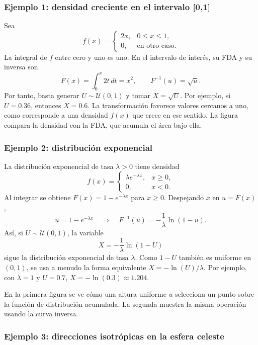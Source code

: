 \subsubsection{Ejemplo 1: densidad creciente en el intervalo [0,1]}

Sea
\[
    f(x)=\begin{cases}2x,&0\leq x\leq1,\\0,&\text{en otro caso.}\end{cases}
\]
La integral de $f$ entre cero y uno es uno. En el intervalo de interés, su FDA
y su inversa son
\[
    F(x)=\int_0^x 2t\,dt=x^2,
    \qquad F^{-1}(u)=\sqrt{u}.
\]
Por tanto, basta generar $U\sim\mathcal{U}(0,1)$ y tomar $X=\sqrt U$. Por
ejemplo, si $U=0.36$, entonces $X=0.6$. La transformación favorece valores
cercanos a uno, como corresponde a una densidad $f(x)$ que crece en ese
sentido. La figura compara la densidad con la FDA, que acumula el área bajo
ella.



\subsubsection{Ejemplo 2: distribución exponencial}

La distribución exponencial de tasa $\lambda>0$ tiene densidad
\[
    f(x)=\begin{cases}\lambda e^{-\lambda x},&x\geq0,\\0,&x<0.\end{cases}
\]
Al integrar se obtiene $F(x)=1-e^{-\lambda x}$ para $x\geq0$. Despejando $x$
en $u=F(x)$,
\[
    u=1-e^{-\lambda x}
    \quad\Longrightarrow\quad
    F^{-1}(u)=-\frac{1}{\lambda}\ln(1-u).
\]
Así, si $U\sim\mathcal{U}(0,1)$, la variable
\[
    X=-\frac{1}{\lambda}\ln(1-U)
\]
sigue la distribución exponencial de tasa $\lambda$. Como $1-U$ también es
uniforme en $(0,1)$, se usa a menudo la forma equivalente
$X=-\ln(U)/\lambda$. Por ejemplo, con $\lambda=1$ y $U=0.7$,
$X=-\ln(0.3)\approx1.204$.

En la primera figura se ve cómo una altura uniforme $u$ selecciona un punto
sobre la función de distribución acumulada. La segunda muestra la misma
operación usando la curva inversa.




\subsubsection{Ejemplo 3: direcciones isotrópicas en la esfera celeste}

